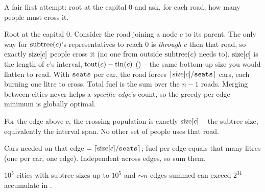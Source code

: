 \begin{attemptgate}
A fair first attempt: root at the capital $0$ and ask, for each road, how many people must
cross it.
\end{attemptgate}

Root at the capital $0$. Consider the road joining a node $c$ to its parent. The only way for
$\operatorname{subtree}(c)$'s representatives to reach $0$ is \emph{through} $c$ then that road, so exactly
$\operatorname{size}[c]$ people cross it (no one from outside $\operatorname{subtree}(c)$ needs to). $\operatorname{size}[c]$ is the
length of $c$'s interval, $\operatorname{tout}(c)-\operatorname{tin}(c)$ () -- the same bottom-up size
you would flatten to read. With $\texttt{seats}$ per car, the road forces
$\lceil\operatorname{size}[c]/\texttt{seats}\rceil$ cars, each burning one litre to cross. Total fuel is the sum
over the $n-1$ roads. Merging between cities never helps a \emph{specific edge}'s count, so
the greedy per-edge minimum is globally optimal.

\begin{observation}
For the edge above $c$, the crossing population is exactly $\operatorname{size}[c]$ -- the subtree size,
equivalently the interval span. No other set of people uses that road.
\end{observation}
\begin{observation}
Cars needed on that edge $=\lceil\operatorname{size}[c]/\texttt{seats}\rceil$; fuel per edge equals that many
litres (one per car, one edge). Independent across edges, so sum them.
\end{observation}
\begin{observation}
$10^5$ cities with subtree sizes up to $10^5$ and $\sim n$ edges summed can exceed
$2^{31}$ -- accumulate in .
\end{observation}

\begin{thinkbox}
\end{thinkbox}

